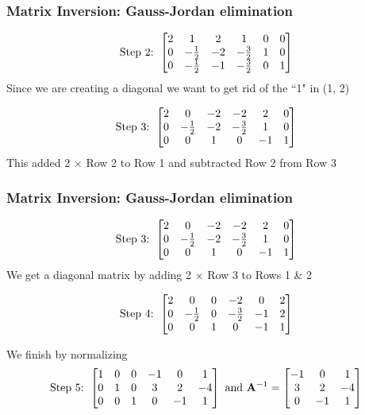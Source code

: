\documentclass{beamer}
\numberwithin{equation}{section}
\begin{document}
\begin{frame}
\frametitle{Matrix Inversion: Gauss-Jordan elimination}

$$\hbox{Step 2: }\begin{bmatrix}
2&1&2& 1& 0& 0\\
0&- \frac{1}{2} &-2& -\frac{3}{2} &1 & 0\\
0&- \frac{1}{2} &-1& -\frac{3}{2} & 0&1
\end{bmatrix}$$
Since we are creating a diagonal we want to get rid of the ``1" in (1, 2) \pause

\vspace{.2in}
$$\hbox{Step 3: }\begin{bmatrix}
2&0&-2& -2& 2& 0\\
0&- \frac{1}{2} &-2& - \frac{3}{2} &1 & 0\\
0&0&1& 0& -1&1
\end{bmatrix}$$ \pause
This added 2 $\times$ Row 2 to Row 1 and subtracted Row 2 from Row 3

\end{frame}



\begin{frame}
\frametitle{Matrix Inversion: Gauss-Jordan elimination}

$$\hbox{Step 3: }\begin{bmatrix}
2&0&-2& -2& 2& 0\\
0&- \frac{1}{2}&-2& - \frac{3}{2}&1 & 0\\
0&0&1& 0& -1&1
\end{bmatrix}$$ \pause
We get a diagonal matrix by adding 2 $\times $ Row 3 to Rows 1 \& 2  \pause

$$\hbox{Step 4: }\begin{bmatrix}
2&0&0& -2& 0& 2\\
0&- \frac{1}{2} &0& -\frac{3}{2} &-1 & 2\\
0&0&1& 0& -1&1
\end{bmatrix}$$ \pause

We finish by normalizing
$$\hbox{Step 5: }\begin{bmatrix}
1&0&0& -1& 0& 1\\
0&1&0&3&2 & -4\\
0&0&1& 0& -1&1
\end{bmatrix}
\hbox{ and } \mathbf{A}^{-1}=
\begin{bmatrix}
 -1& 0& 1\\
3&2 & -4\\
 0& -1&1
\end{bmatrix}
$$

\end{frame}
\end{document}
